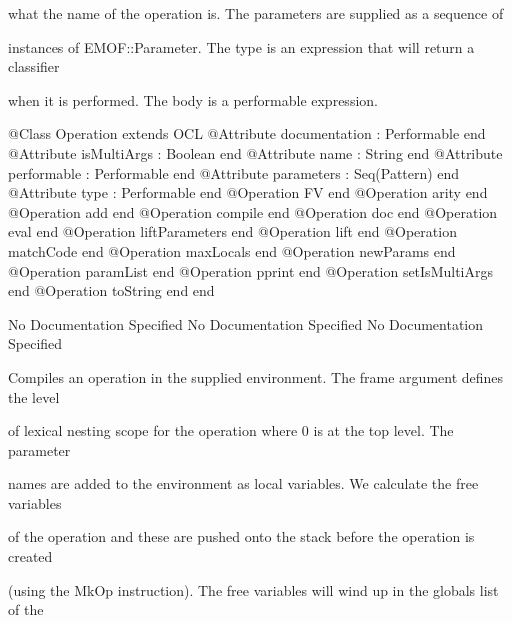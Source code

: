         what the name of the operation is. The parameters are supplied as a sequence of

        instances of EMOF::Parameter. The type is an expression that will return a classifier

        when it is performed. The body is a performable expression.
\begin{Interface}
@Class Operation extends OCL
  @Attribute documentation : Performable end
  @Attribute isMultiArgs : Boolean end
  @Attribute name : String end
  @Attribute performable : Performable end
  @Attribute parameters : Seq(Pattern) end
  @Attribute type : Performable end
  @Operation FV end
  @Operation arity end
  @Operation add end
  @Operation compile end
  @Operation doc end
  @Operation eval end
  @Operation liftParameters end
  @Operation lift end
  @Operation matchCode end
  @Operation maxLocals end
  @Operation newParams end
  @Operation paramList end
  @Operation pprint end
  @Operation setIsMultiArgs end
  @Operation toString end
end
\end{Interface}
No Documentation Specified
No Documentation Specified
No Documentation Specified

      Compiles an operation in the supplied environment. The frame argument defines the level

      of lexical nesting scope for the operation where 0 is at the top level. The parameter

      names are added to the environment as local variables. We calculate the free variables

      of the operation and these are pushed onto the stack before the operation is created

      (using the MkOp instruction). The free variables will wind up in the globals list of the


